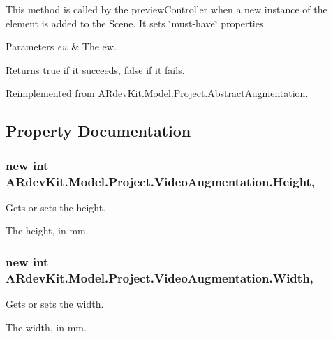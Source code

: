 This method is called by the preview\-Controller when a new instance of the element is added to the Scene. It sets \char`\"{}must-\/have\char`\"{} properties. 


\begin{DoxyParams}{Parameters}
{\em ew} & The ew.\\
\hline
\end{DoxyParams}
\begin{DoxyReturn}{Returns}
true if it succeeds, false if it fails. 
\end{DoxyReturn}


Reimplemented from \hyperlink{class_a_rdev_kit_1_1_model_1_1_project_1_1_abstract_augmentation_a8b02a2eb775b8147e71575694ce8a38f}{A\-Rdev\-Kit.\-Model.\-Project.\-Abstract\-Augmentation}.



\subsection{Property Documentation}
\hypertarget{class_a_rdev_kit_1_1_model_1_1_project_1_1_video_augmentation_accd9c0cc7875d689b73306a38892b4fe}{
\subsubsection[{Height}]{\setlength{\rightskip}{0pt plus 5cm}new int A\-Rdev\-Kit.\-Model.\-Project.\-Video\-Augmentation.\-Height\hspace{0.3cm}{\ttfamily [get]}, {\ttfamily [set]}}}\label{class_a_rdev_kit_1_1_model_1_1_project_1_1_video_augmentation_accd9c0cc7875d689b73306a38892b4fe}


Gets or sets the height. 

The height, in mm. \hypertarget{class_a_rdev_kit_1_1_model_1_1_project_1_1_video_augmentation_aad5c2b8555dfe2fd18f2c67c7f34bbda}{
\subsubsection[{Width}]{\setlength{\rightskip}{0pt plus 5cm}new int A\-Rdev\-Kit.\-Model.\-Project.\-Video\-Augmentation.\-Width\hspace{0.3cm}{\ttfamily [get]}, {\ttfamily [set]}}}\label{class_a_rdev_kit_1_1_model_1_1_project_1_1_video_augmentation_aad5c2b8555dfe2fd18f2c67c7f34bbda}


Gets or sets the width. 

The width, in mm. 